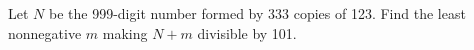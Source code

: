 Let $N$ be the 999-digit number formed by 333 copies of 123. Find the least nonnegative $m$ making $N+m$ divisible by 101.
